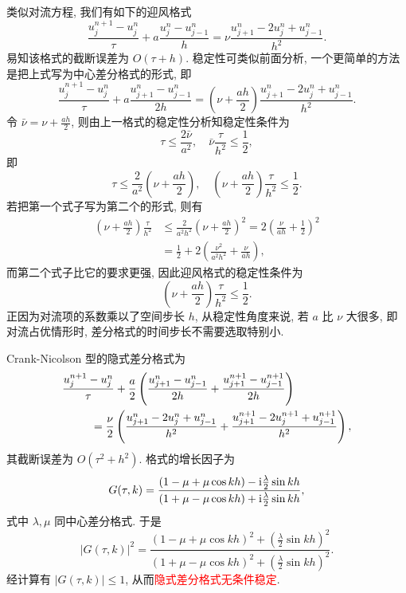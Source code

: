 类似对流方程, 我们有如下的迎风格式
\begin{equation}\label{eq:convection-diffusion-upwind}
    \frac{u_j^{n+1} - u_j^n}{\tau} + a \frac{u_j^n - u_{j-1}^n}{h} = \nu\frac{u_{j+1}^n - 2u_j^n + u_{j-1}^n}{h^2}.
\end{equation}
易知该格式的截断误差为 $O(\tau + h)$. 稳定性可类似前面分析, 一个更简单的方法是把上式写为中心差分格式的形式, 即
\begin{equation*}
    \frac{u_j^{n+1} - u_j^n}{\tau} + a \frac{u_{j+1}^n - u_{j-1}^n}{2h} = \left(\nu + \frac{ah}{2}\right)\frac{u_{j+1}^n - 2u_j^n + u_{j-1}^n}{h^2}.
\end{equation*}
令 $\bar{\nu} = \nu + \frac{ah}{2}$, 则由上一格式的稳定性分析知稳定性条件为
\begin{equation*}
    \tau \leq \frac{2\bar{\nu}}{a^2}, \quad \bar{\nu}\frac{\tau}{h^2} \leq \frac{1}{2},
\end{equation*}
即
\begin{equation*}
    \tau \leq \frac{2}{a^2} \left(\nu + \frac{ah}{2}\right), \quad \left(\nu + \frac{ah}{2}\right)\frac{\tau}{h^2} \leq \frac{1}{2}.
\end{equation*}
若把第一个式子写为第二个的形式, 则有
\begin{align*}
    \left(\nu + \frac{ah}{2}\right)\frac{\tau}{h^2} &\leq \frac{2}{a^2h^2}\left(\nu + \frac{ah}{2}\right)^2 = 2\left(\frac{\nu}{ah} + \frac{1}{2}\right)^2 \\
    &= \frac{1}{2} + 2\left(\frac{\nu^2}{a^2h^2} + \frac{\nu}{ah}\right),
\end{align*}
而第二个式子比它的要求更强, 因此迎风格式的稳定性条件为
\begin{equation}\label{eq:convection-diffusion-upwind-stability}
    \left(\nu + \frac{ah}{2}\right)\frac{\tau}{h^2} \leq \frac{1}{2}.
\end{equation}
正因为对流项的系数乘以了空间步长 $h$, 从稳定性角度来说, 若 $a$ 比 $\nu$ 大很多, 即对流占优情形时, 差分格式的时间步长不需要选取特别小.

Crank-Nicolson 型的隐式差分格式为
\begin{align}\label{eq:convection-diffusion-cn}
    \frac{u_j^{n+1} - u_j^n}{\tau} &+ \frac{a}{2} \left( \frac{u_{j+1}^n - u_{j-1}^n}{2h} + \frac{u_{j+1}^{n+1} - u_{j-1}^{n+1}}{2h} \right) \notag \\
    = \frac{\nu}{2} &\left( \frac{u_{j+1}^n - 2u_j^n + u_{j-1}^n}{h^2} + \frac{u_{j+1}^{n+1} - 2u_j^{n+1} + u_{j-1}^{n+1}}{h^2} \right),
\end{align}
其截断误差为 $O(\tau^2 + h^2)$. 格式的增长因子为
\begin{equation*}
    G(\tau, k) = \frac{(1 - \mu + \mu\cos kh) - \mathrm{i}\frac{\lambda}{2}\sin kh}{(1 + \mu - \mu\cos kh) + \mathrm{i}\frac{\lambda}{2}\sin kh},
\end{equation*}
式中 $\lambda, \mu$ 同中心差分格式. 于是
\begin{equation*}
    |G(\tau, k)|^2 = \frac{(1 - \mu + \mu\cos kh)^2 + \left(\frac{\lambda}{2}\sin kh\right)^2}{(1 + \mu - \mu\cos kh)^2 + \left(\frac{\lambda}{2}\sin kh\right)^2}.
\end{equation*}
经计算有 $|G(\tau, k)| \leq 1$, 从而\textcolor{red}{隐式差分格式无条件稳定}.

